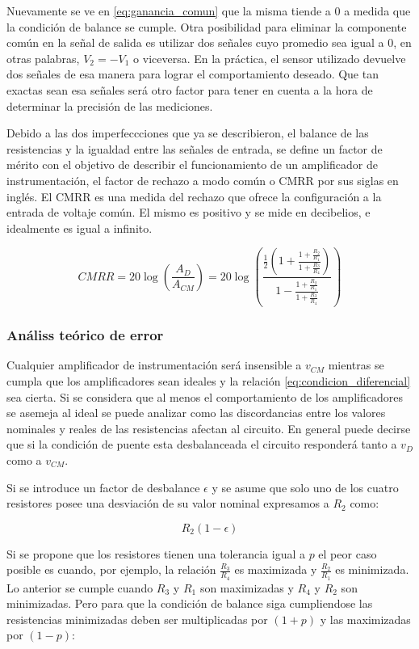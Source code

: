 Nuevamente se ve en \ref{eq:ganancia_comun} que la misma tiende a 0 a medida que la condición de balance se cumple. Otra posibilidad para eliminar la componente común en la señal de salida es utilizar dos señales cuyo promedio sea igual a 0, en otras palabras, $V_2 = - V_1$ o viceversa. En la práctica, el sensor utilizado devuelve dos señales de esa manera para lograr el comportamiento deseado. Que tan exactas sean esa señales será otro factor para tener en cuenta a la hora de determinar la precisión de las mediciones. 


Debido a las dos imperfeccciones que ya se describieron, el balance de las resistencias y la igualdad entre las señales de entrada, se define un factor de mérito con el objetivo de describir el funcionamiento de un amplificador de instrumentación, el factor de rechazo a modo común o CMRR por sus siglas en inglés. El CMRR es una medida del rechazo que ofrece la configuración a la entrada de  voltaje común. El mismo es positivo y se mide en decibelios, e idealmente es igual a infinito.

\begin{equation}\label{eq:CMRR}
CMRR   =   20\log(\frac{A_D}{A_{CM}})   = 20\log(\frac{\frac{1}{2}(1 + \frac{1 + \frac{R_2}{R_1}}{1 + \frac{R_3}{R_4}})}{1 - \frac{1 + \frac{R_2}{R_1}}{1 + \frac{R_3}{R_4}}})
\end{equation}

\subsubsection{Análiss teórico de error}
Cualquier amplificador de instrumentación será insensible a $v_{CM}$ mientras se cumpla que los amplificadores sean ideales y la relación \ref{eq:condicion_diferencial} sea cierta. Si se considera que al menos el comportamiento de los amplificadores se asemeja al ideal se puede analizar como las discordancias entre los valores nominales y reales de las resistencias afectan al circuito. En general puede decirse que si la condición de puente esta desbalanceada el circuito responderá tanto a $v_D$ como a $v_{CM}$.

Si se introduce un factor de desbalance $\epsilon$ y se asume que solo uno de los cuatro resistores posee una desviación de su valor nominal expresamos a $R_2$ como:

\begin{equation}\label{R_2_epsilon}
R_2(1 - \epsilon)
\end{equation} 

Si se propone que los resistores tienen una tolerancia igual a $p$ el peor caso posible es cuando, por ejemplo, la relación $\frac{R_3}{R_4}$ es maximizada y $\frac{R_2}{R_1}$ es minimizada. Lo anterior se cumple cuando $R_3$ y $R_1$ son maximizadas y $R_4$ y $R_2$ son minimizadas. Pero para que la condición de balance siga cumpliendose las resistencias minimizadas deben ser multiplicadas por $(1 + p)$ y las maximizadas por $(1 - p)$:


